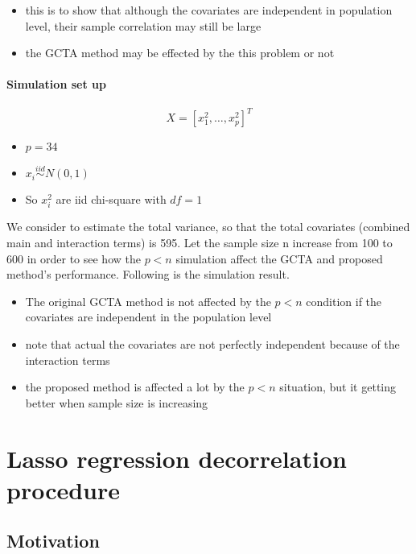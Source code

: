 \documentclass[]{article}
\providecommand{\tightlist}{%
  \setlength{\itemsep}{0pt}\setlength{\parskip}{0pt}}
\let\oldparagraph\paragraph
\renewcommand{\paragraph}[1]{\oldparagraph{#1}\mbox{}}
\begin{document}
\begin{itemize}
\tightlist
\item
  this is to show that although the covariates are independent in
  population level, their sample correlation may still be large
\item
  the GCTA method may be effected by the this problem or not
\end{itemize}

\paragraph{Simulation set up}\label{simulation-set-up}

\[
  X = [x_1^2, \dots, x_p^2]^T
\]

\begin{itemize}
\tightlist
\item
  \(p = 34\)\\
\item
  \(x_i \stackrel{iid}{\sim} N(0,1)\)\\
\item
  So \(x_i^2\) are iid chi-square with \(df = 1\)
\end{itemize}

We consider to estimate the total variance, so that the total covariates
(combined main and interaction terms) is 595. Let the sample size n
increase from 100 to 600 in order to see how the \(p < n\) simulation
affect the GCTA and proposed method's performance. Following is the
simulation result.

\begin{itemize}
\tightlist
\item
  The original GCTA method is not affected by the \(p < n\) condition if
  the covariates are independent in the population level
\item
  note that actual the covariates are not perfectly independent because
  of the interaction terms
\item
  the proposed method is affected a lot by the \(p <n\) situation, but
  it getting better when sample size is increasing
\end{itemize}

\section{Lasso regression decorrelation
procedure}\label{lasso-regression-decorrelation-procedure}

\subsection{Motivation}\label{motivation-1}
\end{document}
